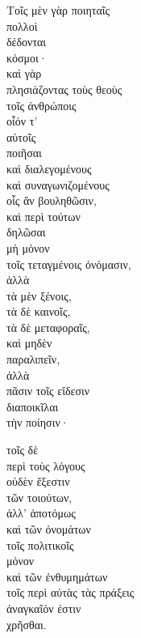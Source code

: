 
{\large
\noindent Τοῖς μὲν γὰρ ποιηταῖς \\
\tabto{2em} πολλοὶ\\ 
δέδονται\\ 
\tabto{2em} κόσμοι·\\
καὶ γὰρ \\
\tabto{2em} πλησιάζοντας τοὺς θεοὺς\\
\tabto{4em} τοῖς ἀνθρώποις \\
οἷόν τ' \\
\tabto{2em} αὐτοῖς \\
\tabto{4em} ποιῆσαι\\
\tabto{2em} καὶ διαλεγομένους \\
\tabto{2em} καὶ συναγωνιζομένους\\
\tabto{4em} οἷς ἂν βουληθῶσιν,\\
\tabto{2em} καὶ περὶ τούτων \\
\tabto{4em} δηλῶσαι \\
\tabto{6em} μὴ μόνον \\
\tabto{8em} τοῖς τεταγμένοις ὀνόμασιν, \\
\tabto{6em} ἀλλὰ \\
\tabto{8em} τὰ μὲν ξένοις, \\
\tabto{8em} τὰ δὲ καινοῖς, \\
\tabto{8em} τὰ δὲ μεταφοραῖς,\\
\tabto{2em} καὶ μηδὲν \\
\tabto{4em} παραλιπεῖν, \\
\tabto{2em} ἀλλὰ \\
\tabto{6em} πᾶσιν τοῖς εἴδεσιν \\
\tabto{4em} διαποικῖλαι \\
\tabto{6em} τὴν ποίησιν·

\noindent τοῖς δὲ \\
\tabto{2em} περὶ τοὺς λόγους \\
οὐδὲν ἔξεστιν \\
\tabto{2em} τῶν τοιούτων,\\
ἀλλ' ἀποτόμως \\
καὶ τῶν ὀνομάτων \\
\tabto{2em} τοῖς πολιτικοῖς \\
\tabto{4em} μόνον \\
καὶ τῶν ἐνθυμημάτων \\
\tabto{2em} τοῖς περὶ αὐτὰς τὰς πράξεις \\
ἀναγκαῖόν ἐστιν \\
\tabto{2em} χρῆσθαι.\\

}

